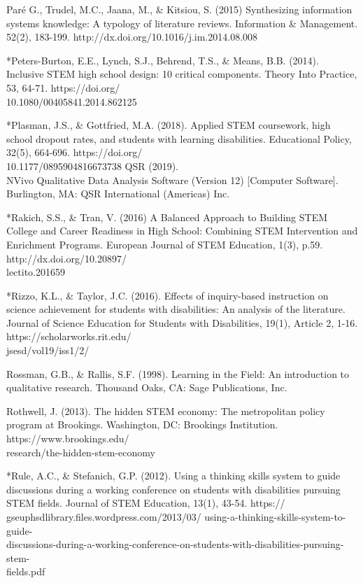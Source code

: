 \documentclass[11pt]{sig-alternate}
\begin{document}
\begin{large}
Paré G., Trudel, M.C., Jaana, M., \& Kitsiou, S. (2015) Synthesizing information systems knowledge: A typology of literature reviews. Information \& Management. 52(2), 
183-199. http://dx.doi.org/10.1016/j.im.2014.08.008

*Peters-Burton, E.E., Lynch, S.J., Behrend, T.S., \& Means, B.B. (2014). Inclusive STEM high school design: 10 critical components. Theory Into Practice, 53, 64-71. 
https://doi.org/\\10.1080/00405841.2014.862125

*Plasman, J.S., \& Gottfried, M.A. (2018). Applied STEM coursework, high school dropout rates, and students with learning disabilities. Educational Policy, 32(5), 664-696. https://doi.org/\\10.1177/0895904816673738
QSR (2019). \\NVivo Qualitative Data Analysis Software (Version 12) [Computer Software]. Burlington, MA: QSR International (Americas) Inc.

*Rakich, S.S., \& Tran, V. (2016) A Balanced Approach to Building STEM College and Career Readiness in High School: Combining STEM Intervention and Enrichment Programs. European Journal of STEM Education, 1(3), p.59. http://dx.doi.org/10.20897/\\lectito.201659

*Rizzo, K.L., \& Taylor, J.C. (2016). Effects of inquiry-based instruction on science achievement for students with disabilities: An analysis of the literature. Journal of Science Education for Students with Disabilities, 19(1), Article 2, 1-16. https://scholarworks.rit.edu/\\jsesd/vol19/iss1/2/

Rossman, G.B., \& Rallis, S.F. (1998). Learning in the Field: An introduction to qualitative 
research. Thousand Oaks, CA: Sage Publications, Inc. 

Rothwell, J. (2013). The hidden STEM economy: The metropolitan policy program at Brookings. Washington, DC: Brookings Institution. https://www.brookings.edu/\\research/the-hidden-stem-economy

*Rule, A.C., \& Stefanich, G.P. (2012). Using a thinking skills system to guide discussions during a working conference on students with disabilities pursuing STEM fields. Journal of STEM Education, 13(1), 43-54. https://\\gseuphsdlibrary.files.wordpress.com/2013/03/
using-a-thinking-skills-system-to-guide- \\discussions-during-a-working-conference-on-students-with-disabilities-pursuing-stem-\\fields.pdf


\end{large}
\end{document}
